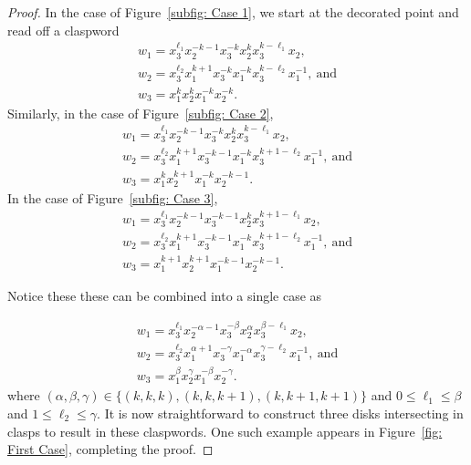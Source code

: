 \documentclass[11pt]{amsart}
\theoremstyle{remark}
\begin{document}
\begin{proof}
  In the case of Figure~\ref{subfig: Case 1}, we start at the decorated point and read off a claspword
  \begin{equation*}\label{eqn:case1}
  \begin{array}{l}
  w_{1}=x_3^{\ell_1}x_2^{-k-1}x_3^{-k}x_2^kx_3^{k-\ell_1}x_2,
  \\
  w_{2}=x_3^{\ell_2}x_1^{k+1}x_3^{-k}x_1^{-k}x_3^{k-\ell_2}x_1^{-1},~\text{and}
  \\
  w_{3}=x_1^kx_2^kx_1^{-k}x_2^{-k}.
  \end{array}
  \end{equation*}
  Similarly, in the case of Figure~\ref{subfig: Case 2}, 
   \begin{equation*}\label{eqn:case2}
  \begin{array}{l}
  w_{1}=x_3^{\ell_1}x_2^{-k-1}x_3^{-k}x_2^kx_3^{k-\ell_1}x_2,
  \\
  w_{2}=x_3^{\ell_2}x_1^{k+1}x_3^{-k-1}x_1^{-k}x_3^{k+1-\ell_2}x_1^{-1},~\text{and}
  \\
  w_{3}=x_1^kx_2^{k+1}x_1^{-k}x_2^{-k-1}.
  \end{array}
  \end{equation*}
  In the case of Figure~\ref{subfig: Case 3}, 
   \begin{equation*}\label{eqn:case3}
  \begin{array}{l}
  w_{1}=x_3^{\ell_1}x_2^{-k-1}x_3^{-k-1}x_2^kx_3^{k+1-\ell_1}x_2,
  \\
  w_{2}=x_3^{\ell_2}x_1^{k+1}x_3^{-k-1}x_1^{-k}x_3^{k+1-\ell_2}x_1^{-1},~\text{and}
  \\
  w_{3}=x_1^{k+1}x_2^{k+1}x_1^{-k-1}x_2^{-k-1}.
  \end{array}
  \end{equation*}

 Notice these these can be combined into a single case as 

  \begin{equation}\label{eqn:combineCase}
  \begin{array}{l}
  w_{1}=x_3^{\ell_1}x_2^{-\alpha-1}x_3^{-\beta}x_2^\alpha x_3^{\beta-\ell_1}x_2,
  \\
  w_{2}=x_3^{\ell_2}x_1^{\alpha+1}x_3^{-\gamma}x_1^{-\alpha}x_3^{\gamma-\ell_2}x_1^{-1},~\text{and}
  \\
  w_{3}=x_1^\beta x_2^\gamma x_1^{-\beta}x_2^{-\gamma}.
  \end{array}
  \end{equation}
  where $(\alpha,\beta,\gamma)\in\{(k,k,k), (k,k,k+1),(k,k+1, k+1)\}$ and $0\le \ell_1\le \beta$ and $1\le \ell_2\le \gamma$. It is now straightforward to construct three disks intersecting in clasps to result in these claspwords.  One such example appears in Figure~\ref{fig: First Case}, completing the proof.  \end{proof}

  


\end{document}

